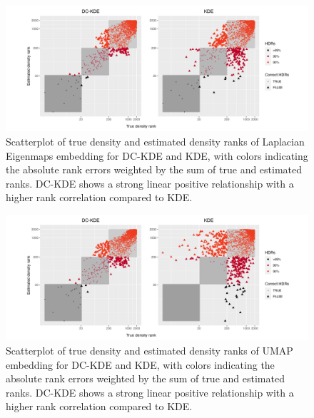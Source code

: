 \documentclass[11pt,a4paper,]{article}
\begin{document}
\begin{figure}

{\centering \includegraphics[width=1\linewidth]{figures/Twin Peak2000_densityrank_comparison_le_radius8_r0_5_logrank_rec_colprob_smallblocks3_crossfalse} 

}

\caption{Scatterplot of true density and estimated density ranks of Laplacian Eigenmaps embedding for DC-KDE and KDE, with colors indicating the absolute rank errors weighted by the sum of true and estimated ranks. DC-KDE shows a strong linear positive relationship with a higher rank correlation compared to KDE.}\label{fig:tpleden}
\end{figure}

\begin{figure}

{\centering \includegraphics[width=1\linewidth]{figures/Twin Peak2000_densityrank_comparison_umap_radius8_r0_5_logrank_rec_colprob_smallblocks3_crossfalse} 

}

\caption{Scatterplot of true density and estimated density ranks of UMAP embedding for DC-KDE and KDE, with colors indicating the absolute rank errors weighted by the sum of true and estimated ranks. DC-KDE shows a strong linear positive relationship with a higher rank correlation compared to KDE.}\label{fig:tpumapden}
\end{figure}
\end{document}
